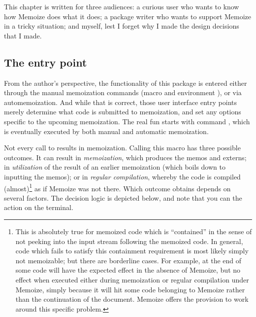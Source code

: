 \documentclass[a4paper,11pt]{article}
\begin{document}
This chapter is written for three audiences: a curious user who wants to
know how Memoize does what it does; a package writer who wants to support
Memoize in a tricky situation; and myself, lest I forget why I made the design
decisions that I made.

\subsection{The entry point}
\label{sec:Memoize}


From the author's perspective, the functionality of this package is entered
either through the manual memoization commands (macro  and
environment ), or via automemoization.  And while that is
correct, those user interface entry points merely determine what code is
submitted to memoization, and set any options specific to the upcoming
memoization.  The real fun starts with command , which
is eventually executed by both manual and automatic memoization.

Not every call to  results in memoization.  Calling this macro
has three possible outcomes.  It can result in \emph{memoization}, which
produces the memos and externs; in \emph{utilization} of the result of an
earlier memoization (which boils down to inputting the memos); or in
\emph{regular compilation}, whereby the code is compiled
(almost)\footnote{\label{fn:regular-compilation-almost}This is absolutely true
  for memoized code which is ``contained'' in the sense of not peeking into the
  input stream following the memoized code.  In general, code which fails to
  satisfy this containment requirement is most likely simply not memoizable;
  but there are borderline cases.  For example,  at the
  end of some code will have the expected effect in the absence of Memoize, but
  no effect when executed either during memoization or regular compilation
  under Memoize, simply because it will hit some code belonging to Memoize
  rather than the continuation of the document.  Memoize offers the
   provision to work around this specific problem.} as if
Memoize was not there.  Which outcome obtains depends on several factors.  The
decision logic is depicted below, and note that you can  the
action on the terminal.
\end{document}
